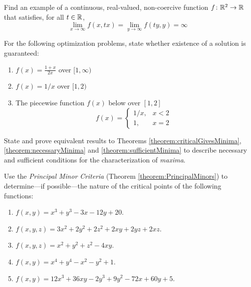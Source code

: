 \begin{problem}[Advanced]\cite[p.36, \#32]{peressini1988mathematics}
Find an example of a continuous, real-valued, non-coercive function $f\colon \mathbb{R}^2 \to \mathbb{R}$ that satisfies, for all $t \in \mathbb{R}$,
\begin{equation*}
\lim_{x \to \infty} f(x, tx) = \lim_{y \to \infty} f(ty, y) = \infty
\end{equation*}
\end{problem}

\begin{problem}[Intermediate]
For the following optimization problems, state whether existence of a solution is guaranteed:
\begin{enumerate}
	\item $f(x) = \frac{1+x}{2x}$ over $[1,\infty)$
	\item $f(x) = 1/x$ over $[1,2)$
	\item The piecewise function $f(x)$ below over $[1,2]$
	\begin{equation*}
	f(x) = \begin{cases}
	1/x, &x<2 \\
	1,   &x=2
	\end{cases}
	\end{equation*}
\end{enumerate}
\end{problem}

\begin{problem}[Advanced]
State and prove equivalent results to Theorems \ref{theorem:criticalGivesMinima}, \ref{theorem:necessaryMinima} and \ref{theorem:sufficientMinima} to describe necessary and sufficient conditions for the characterization of \emph{maxima}.
\end{problem}

\begin{problem}[Intermediate]\cite[p.32, \#7]{peressini1988mathematics}
Use the \emph{Principal Minor Criteria} (Theorem \ref{theorem:PrincipalMinors}) to determine---if possible---the nature of the critical points of the following functions:
\begin{enumerate}
	\item $f(x,y) = x^3+y^3-3x-12y+20$.
	\item $f(x,y,z) = 3x^2+2y^2+2z^2+2xy+2yz+2xz$.
	\item $f(x,y,z) = x^2+y^2+z^2-4xy$.
	\item $f(x,y) = x^4+y^4-x^2-y^2+1$.
	\item $f(x,y) = 12x^3+36xy-2y^3+9y^2-72x+60y+5$.
\end{enumerate}
\end{problem}



